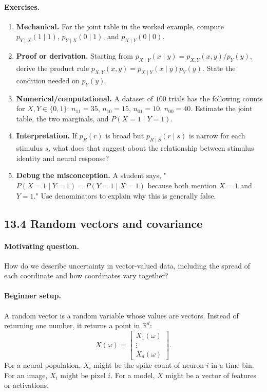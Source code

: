 \paragraph{Exercises.}
\begin{enumerate}[label=\textbf{13.3.\arabic*.}, leftmargin=*]
\item \textbf{Mechanical.} For the joint table in the worked example, compute \(p_{Y\mid X}(1\mid1)\), \(p_{Y\mid X}(0\mid1)\), and \(p_{X\mid Y}(0\mid0)\).
\item \textbf{Proof or derivation.} Starting from \(p_{X\mid Y}(x\mid y)=p_{X,Y}(x,y)/p_Y(y)\), derive the product rule \(p_{X,Y}(x,y)=p_{X\mid Y}(x\mid y)p_Y(y)\). State the condition needed on \(p_Y(y)\).
\item \textbf{Numerical/computational.} A dataset of \(100\) trials has the following counts for \(X,Y\in\{0,1\}\): \(n_{11}=35\), \(n_{10}=15\), \(n_{01}=10\), \(n_{00}=40\). Estimate the joint table, the two marginals, and \(P(X=1\mid Y=1)\).
\item \textbf{Interpretation.} If \(p_R(r)\) is broad but \(p_{R\mid S}(r\mid s)\) is narrow for each stimulus \(s\), what does that suggest about the relationship between stimulus identity and neural response?
\item \textbf{Debug the misconception.} A student says, "\(P(X=1\mid Y=1)=P(Y=1\mid X=1)\) because both mention \(X=1\) and \(Y=1\)." Use denominators to explain why this is generally false.
\end{enumerate}

\subsection{13.4 Random vectors and covariance}

\paragraph{Motivating question.}
How do we describe uncertainty in vector-valued data, including the spread of each coordinate and how coordinates vary together?

\paragraph{Beginner setup.}
A random vector is a random variable whose values are vectors. Instead of returning one number, it returns a point in \(\mathbb{R}^d\):
\[
X(\omega)=
\begin{bmatrix}
X_1(\omega)\\
\vdots\\
X_d(\omega)
\end{bmatrix}.
\]
For a neural population, \(X_i\) might be the spike count of neuron \(i\) in a time bin. For an image, \(X_i\) might be pixel \(i\). For a model, \(X\) might be a vector of features or activations.

